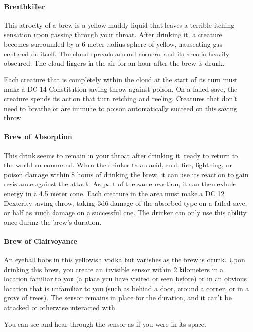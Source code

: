 \paragraph{Breathkiller} %
    This atrocity of a brew is a yellow muddy liquid that leaves a terrible itching sensation upon passing through your throat.
    After drinking it, a creature becomes surrounded by a 6-meter-radius sphere of yellow, nauseating gas centered on itself.
    The cloud spreads around corners, and its area is heavily obscured.
    The cloud lingers in the air for an hour after the brew is drunk.

    Each creature that is completely within the cloud at the start of its turn must make a DC 14 Constitution saving throw against poison.
    On a failed save, the creature spends its action that turn retching and reeling.
    Creatures that don't need to breathe or are immune to poison automatically succeed on this saving throw.
\paragraph{Brew of Absorption} %
    This drink seems to remain in your throat after drinking it, ready to return to the world on command.
    When the drinker takes acid, cold, fire, lightning, or poison damage within 8 hours of drinking the brew, it can use its reaction to gain resistance against the attack.
    As part of the same reaction, it can then exhale energy in a 4.5 meter cone.
    Each creature in the area must make a DC 12 Dexterity saving throw, taking 3d6 damage of the absorbed type on a failed save, or half as much damage on a successful one.
    The drinker can only use this ability once during the brew's duration.
\paragraph{Brew of Clairvoyance} %
    An eyeball bobs in this yellowish vodka but vanishes as the brew is drunk.
    Upon drinking this brew, you create an invisible sensor within 2 kilometers in a location familiar to you (a place you have visited or seen before) or in an obvious location that is unfamiliar to you (such as behind a door, around a corner, or in a grove of trees).
    The sensor remains in place for the duration, and it can't be attacked or otherwise interacted with.

    You can see and hear through the sensor as if you were in its space.

